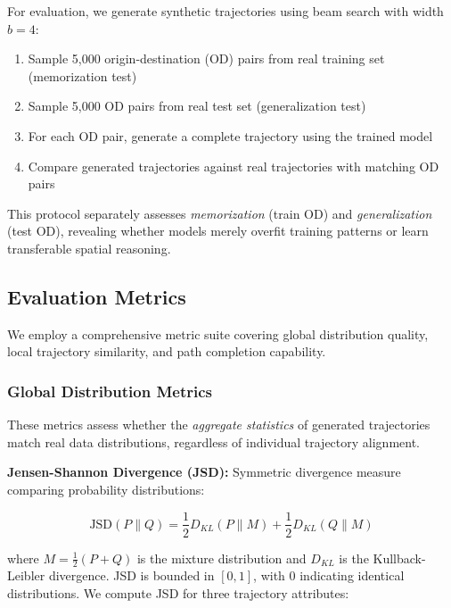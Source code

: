 For evaluation, we generate synthetic trajectories using beam search with width $b = 4$:

\begin{enumerate}[noitemsep,topsep=0pt]
\item Sample 5,000 origin-destination (OD) pairs from real training set (memorization test)
\item Sample 5,000 OD pairs from real test set (generalization test)
\item For each OD pair, generate a complete trajectory using the trained model
\item Compare generated trajectories against real trajectories with matching OD pairs
\end{enumerate}

This protocol separately assesses \emph{memorization} (train OD) and \emph{generalization} (test OD), revealing whether models merely overfit training patterns or learn transferable spatial reasoning.

\subsection{Evaluation Metrics}
\label{sec:eval-metrics}

We employ a comprehensive metric suite covering global distribution quality, local trajectory similarity, and path completion capability.

\subsubsection{Global Distribution Metrics}

These metrics assess whether the \emph{aggregate statistics} of generated trajectories match real data distributions, regardless of individual trajectory alignment.

\textbf{Jensen-Shannon Divergence (JSD):} Symmetric divergence measure comparing probability distributions:

\begin{equation}
\text{JSD}(P \parallel Q) = \frac{1}{2} D_{KL}(P \parallel M) + \frac{1}{2} D_{KL}(Q \parallel M)
\label{eq:jsd}
\end{equation}

where $M = \frac{1}{2}(P + Q)$ is the mixture distribution and $D_{KL}$ is the Kullback-Leibler divergence. JSD is bounded in $[0, 1]$, with 0 indicating identical distributions. We compute JSD for three trajectory attributes:

